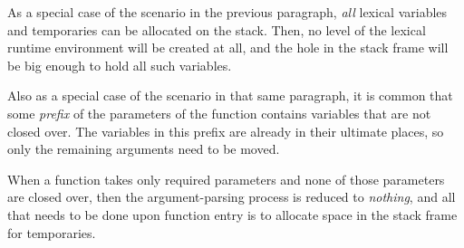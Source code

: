 As a special case of the scenario in the previous paragraph,
\emph{all} lexical variables and temporaries can be allocated on the
stack.  Then, no level of the lexical runtime environment will be
created at all, and the hole in the stack frame will be big enough to
hold all such variables.  

Also as a special case of the scenario in that same paragraph, it is
common that some \emph{prefix} of the parameters of the function
contains variables that are not closed over.  The variables in this
prefix are already in their ultimate places, so only the remaining
arguments need to be moved. 

When a function takes only required parameters and none of those
parameters are closed over, then the argument-parsing process is
reduced to \emph{nothing}, and all that needs to be done upon function
entry is to allocate space in the stack frame for temporaries. 

